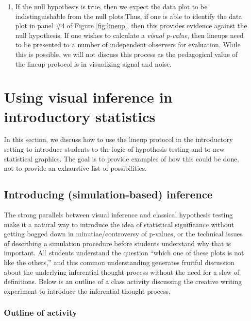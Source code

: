 \documentclass[12pt]{article}
\providecommand{\tightlist}{%
  \setlength{\itemsep}{0pt}\setlength{\parskip}{0pt}}
\begin{document}
\begin{enumerate}
\def\labelenumi{\arabic{enumi}.}
\setcounter{enumi}{3}
\tightlist
\item
  If the null hypothesis is true, then we expect the data plot to be
  indistinguishable from the null plots.Thus, if one is able to identify
  the data plot in panel \#4 of Figure \ref{fig:lineup}, then this
  provides evidence against the null hypothesis. If one wishes to
  calculate a \emph{visual p-value}, then lineups need to be presented
  to a number of independent observers for evaluation. While this is
  possible, we will not discuss this process as the pedagogical value of
  the lineup protocol is in visualizing signal and noise.
\end{enumerate}

\section{Using visual inference in introductory statistics}
\label{sec:intro}

In this section, we discuss how to use the lineup protocol in the
introductory setting to introduce students to the logic of hypothesis
testing and to new statistical graphics. The goal is to provide examples
of how this could be done, not to provide an exhaustive list of
possibilities.

\hypertarget{introducing-simulation-based-inference}{%
\subsection{Introducing (simulation-based)
inference}\label{introducing-simulation-based-inference}}

The strong parallels between visual inference and classical hypothesis
testing make it a natural way to introduce the idea of statistical
significance without getting bogged down in minutiae/controversy of
p-values, or the technical issues of describing a simulation procedure
before students understand why that is important. All students
understand the question ``which one of these plots is not like the
others,'' and this common understanding generates fruitful discussion
about the underlying inferential thought process without the need for a
slew of definitions. Below is an outline of a class activity discussing
the creative writing experiment to introduce the inferential thought
process.

\hypertarget{outline-of-activity}{%
\subsubsection{Outline of activity}\label{outline-of-activity}}
\end{document}
